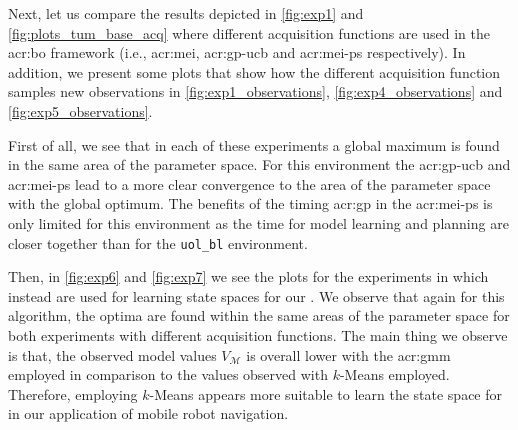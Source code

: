 \newpage

Next, let us compare the results depicted in \autoref{fig:exp1} and \autoref{fig:plots_tum_base_acq} where different acquisition functions are used in the \acrshort{acr:bo} framework (i.e., \acrshort{acr:mei}, \acrshort{acr:gp-ucb} and \acrshort{acr:mei-ps} respectively).
In addition, we present some plots that show how the different acquisition function samples new observations in \autoref{fig:exp1_observations}, \autoref{fig:exp4_observations} and \autoref{fig:exp5_observations}.

First of all, we see that in each of these experiments a global maximum is found in the same area of the parameter space.
For this environment the \acrshort{acr:gp-ucb} and \acrshort{acr:mei-ps} lead to a more clear convergence to the area of the parameter space with the global optimum.
The benefits of the timing \acrshort{acr:gp} in the \acrshort{acr:mei-ps} is only limited for this environment as the time for model learning and planning are closer together than for the \texttt{uol\_bl} environment.

Then, in \autoref{fig:exp6} and \autoref{fig:exp7} we see the plots for the experiments in which instead  are used for learning state spaces for our .
We observe that again for this algorithm, the optima are found within the same areas of the parameter space for both experiments with different acquisition functions.
The main thing we observe is that, the observed model values $V_\mathcal{M}$ is overall lower with the \acrshort{acr:gmm} employed in comparison to the values observed with $k$-Means employed.
Therefore, employing $k$-Means appears more suitable to learn the state space for  in our application of mobile robot navigation.

